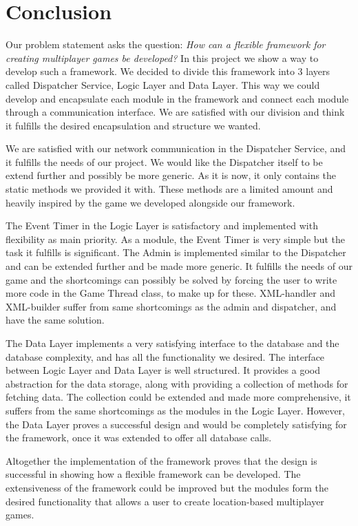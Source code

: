 \section{Conclusion}
Our problem statement asks the question: \textit{How can a flexible framework for creating multiplayer games be developed?} In this project we show a way to develop such a framework. We decided to divide this framework into 3 layers called Dispatcher Service, Logic Layer and Data Layer. This way we could develop and encapsulate each module in the framework and connect each module through a communication interface. We are satisfied with our division and think it fulfills the desired encapsulation and structure we wanted. 

We are satisfied with our network communication in the Dispatcher Service, and it fulfills the needs of our project. We would like the Dispatcher itself to be extend further and possibly be more generic. As it is now, it only contains the static methods we provided it with. These methods are a limited amount and heavily inspired by the game we developed alongside our framework. 

The Event Timer in the Logic Layer is satisfactory and implemented with flexibility as main priority. As a module, the Event Timer is very simple but the task it fulfills is significant. The Admin is implemented similar to the Dispatcher and can be extended further and be made more generic. It fulfills the needs of our game and the shortcomings can possibly be solved by forcing the user to write more code in the Game Thread class, to make up for these.
XML-handler and XML-builder suffer from same shortcomings as the admin and dispatcher, and have the same solution.

The Data Layer implements a very satisfying interface to the database and the database complexity, and has all the functionality we desired. The interface between Logic Layer and Data Layer is well structured. It provides a good abstraction for the data storage, along with providing a collection of methods for fetching data. The collection could be extended and made more comprehensive, it suffers from the same shortcomings as the modules in the Logic Layer. However, the Data Layer proves a successful design and would be completely satisfying for the framework, once it was extended to offer all database calls. 

Altogether the implementation of the framework proves that the design is successful in showing how a flexible framework can be developed. The extensiveness of the framework could be improved but the modules form the desired functionality that allows a user to create location-based multiplayer games. 